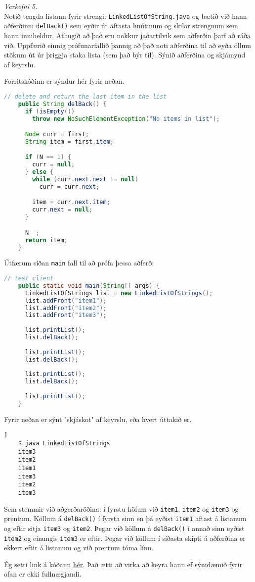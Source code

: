 \documentclass[a4paper, 12pt]{article}
\begin{document}
\newpage
\noindent
\emph{Verkefni 5.} \\
Notið tengda listann fyrir strengi: \texttt{LinkedListOfString.java} og bætið við 
hann aðferðinni \texttt{delBack()} sem eyðir út aftasta hnútinum og skilar strengnum sem 
hann inniheldur.  Athugið að það eru nokkur jaðartilvik sem aðferðin þarf að ráða við.  
Uppfærið einnig prófunarfallið þannig að það noti aðferðina til að eyða öllum stökum út 
úr þriggja staka lista (sem það býr til).  Sýnið aðferðina og skjámynd af keyrslu. 

\begin{description}[leftmargin=!,labelwidth=\widthof{\bfseries Example:},labelindent=0em, ]
  \item[Úrlausn]
  Forritskóðinn er sýndur hér fyrir neðan.
  \begin{lstlisting}[language=java]
    // delete and return the last item in the list
    public String delBack() {
      if (isEmpty())
        throw new NoSuchElementException("No items in list");

      Node curr = first;
      String item = first.item;

      if (N == 1) {
        curr = null;
      } else {
        while (curr.next.next != null)
          curr = curr.next;

        item = curr.next.item;
        curr.next = null;
      }

      N--;
      return item;
    }
  \end{lstlisting}
  Útfærum síðan \texttt{main} fall til að prófa þessa aðferð:
  \begin{lstlisting}[language=java]
    // test client
    public static void main(String[] args) {
      LinkedListOfStrings list = new LinkedListOfStrings();
      list.addFront("item1");
      list.addFront("item2");
      list.addFront("item3");
  
      list.printList();
      list.delBack();
  
      list.printList();
      list.delBack();
  
      list.printList();
      list.delBack();
  
      list.printList();
    }
  \end{lstlisting}
  Fyrir neðan er sýnt "skjáskot" af keyrslu, eða hvert úttakið er.
  \begin{lstlisting}]
    $ java LinkedListOfStrings
    item3
    item2
    item1
    item3
    item2
    item3
  \end{lstlisting}
  Sem stemmir við aðgerðaröðina: í fyrstu höfum við \texttt{item1}, \texttt{item2} og \texttt{item3}
  og prentum. Köllum á \texttt{delBack()} í fyrsta sinn en þá eyðist \texttt{item1} aftast á listanum
  og eftir sitja \texttt{item3} og \texttt{item2}. Þegar við köllum á \texttt{delBack()} í annað sinn eyðist
  \texttt{item2} og einungis \texttt{item3} er eftir. Þegar við köllum í síðasta skipti á aðferðina er ekkert
  eftir á listanum og við prentum tóma línu.

  \medskip
  Ég setti link á kóðann \href{https://github.com/lvthnn/TOL203G/blob/master/HD1/D5/LinkedListOfStrings.java}{hér}. Það ætti
  að virka að keyra hann ef sýnidæmið fyrir ofan er ekki fullnægjandi.
\end{description}
\end{document}

